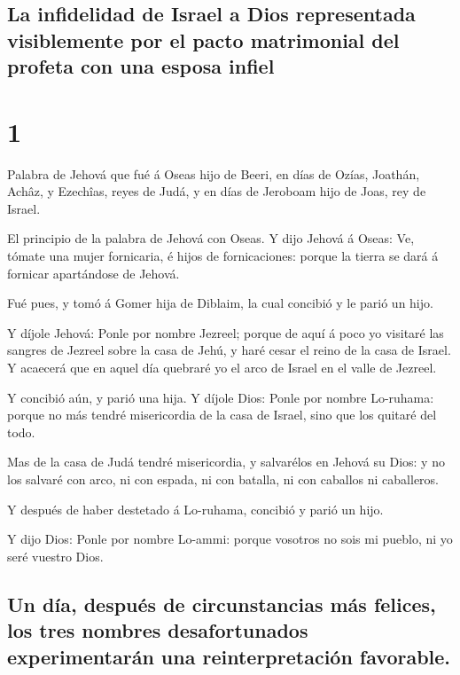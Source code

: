 \hypertarget{la-infidelidad-de-israel-a-dios-representada-visiblemente-por-el-pacto-matrimonial-del-profeta-con-una-esposa-infiel}{%
\subsection{La infidelidad de Israel a Dios representada visiblemente
por el pacto matrimonial del profeta con una esposa
infiel}\label{la-infidelidad-de-israel-a-dios-representada-visiblemente-por-el-pacto-matrimonial-del-profeta-con-una-esposa-infiel}}

\hypertarget{section}{%
\section{1}\label{section}}

 Palabra de Jehová que fué á Oseas hijo de Beeri, en días de
Ozías, Joathán, Achâz, y Ezechîas, reyes de Judá, y en días de Jeroboam
hijo de Joas, rey de Israel.

 El principio de la palabra de Jehová con Oseas. Y dijo
Jehová á Oseas: Ve, tómate una mujer fornicaria, é hijos de
fornicaciones: porque la tierra se dará á fornicar apartándose de
Jehová.

 Fué pues, y tomó á Gomer hija de Diblaim, la cual concibió
y le parió un hijo.

 Y díjole Jehová: Ponle por nombre Jezreel; porque de aquí á
poco yo visitaré las sangres de Jezreel sobre la casa de Jehú, y haré
cesar el reino de la casa de Israel.  Y acaecerá que en
aquel día quebraré yo el arco de Israel en el valle de Jezreel.

 Y concibió aún, y parió una hija. Y díjole Dios: Ponle por
nombre Lo-ruhama: porque no más tendré misericordia de la casa de
Israel, sino que los quitaré del todo.

 Mas de la casa de Judá tendré misericordia, y salvarélos en
Jehová su Dios: y no los salvaré con arco, ni con espada, ni con
batalla, ni con caballos ni caballeros.

 Y después de haber destetado á Lo-ruhama, concibió y parió
un hijo.

 Y dijo Dios: Ponle por nombre Lo-ammi: porque vosotros no
sois mi pueblo, ni yo seré vuestro Dios.

\hypertarget{un-duxeda-despuuxe9s-de-circunstancias-muxe1s-felices-los-tres-nombres-desafortunados-experimentaruxe1n-una-reinterpretaciuxf3n-favorable.}{%
\subsection{Un día, después de circunstancias más felices, los tres
nombres desafortunados experimentarán una reinterpretación
favorable.}\label{un-duxeda-despuuxe9s-de-circunstancias-muxe1s-felices-los-tres-nombres-desafortunados-experimentaruxe1n-una-reinterpretaciuxf3n-favorable.}}

